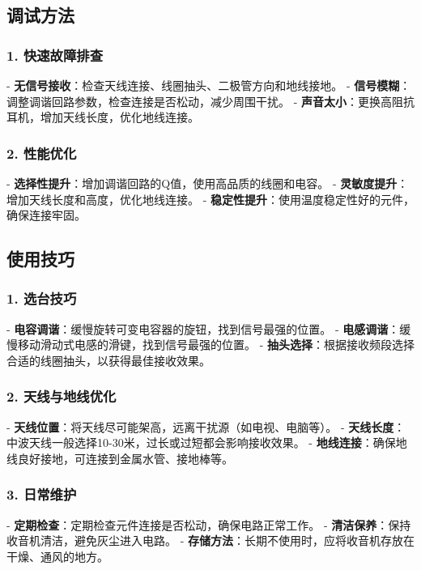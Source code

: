\documentclass[12pt,UTF8]{ctexbook}
\begin{document}
\subsection{调试方法}

\subsubsection{1. 快速故障排查}

- \textbf{无信号接收}：检查天线连接、线圈抽头、二极管方向和地线接地。
- \textbf{信号模糊}：调整调谐回路参数，检查连接是否松动，减少周围干扰。
- \textbf{声音太小}：更换高阻抗耳机，增加天线长度，优化地线连接。

\subsubsection{2. 性能优化}

- \textbf{选择性提升}：增加调谐回路的Q值，使用高品质的线圈和电容。
- \textbf{灵敏度提升}：增加天线长度和高度，优化地线连接。
- \textbf{稳定性提升}：使用温度稳定性好的元件，确保连接牢固。

\subsection{使用技巧}

\subsubsection{1. 选台技巧}

- \textbf{电容调谐}：缓慢旋转可变电容器的旋钮，找到信号最强的位置。
- \textbf{电感调谐}：缓慢移动滑动式电感的滑键，找到信号最强的位置。
- \textbf{抽头选择}：根据接收频段选择合适的线圈抽头，以获得最佳接收效果。

\subsubsection{2. 天线与地线优化}

- \textbf{天线位置}：将天线尽可能架高，远离干扰源（如电视、电脑等）。
- \textbf{天线长度}：中波天线一般选择10-30米，过长或过短都会影响接收效果。
- \textbf{地线连接}：确保地线良好接地，可连接到金属水管、接地棒等。

\subsubsection{3. 日常维护}

- \textbf{定期检查}：定期检查元件连接是否松动，确保电路正常工作。
- \textbf{清洁保养}：保持收音机清洁，避免灰尘进入电路。
- \textbf{存储方法}：长期不使用时，应将收音机存放在干燥、通风的地方。
\end{document}
